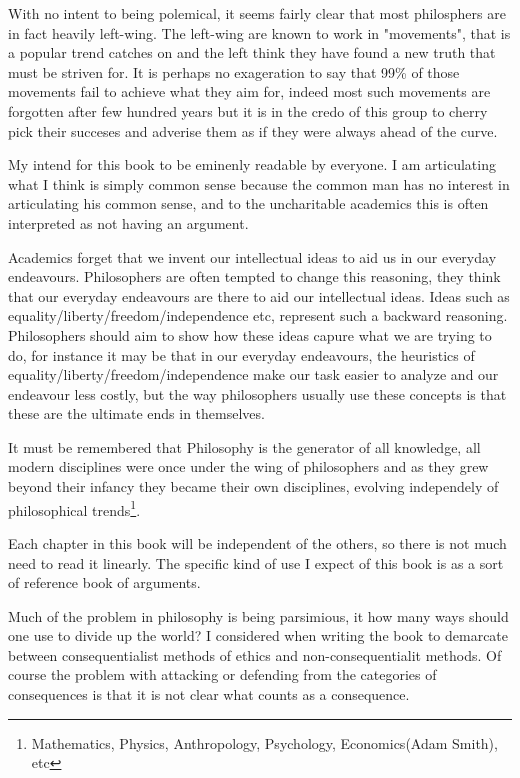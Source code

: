 With no intent to being polemical, it seems fairly clear that most philosphers are in fact heavily left-wing. The left-wing are known to work in "movements", that is a popular trend catches on and the left think they have found a new truth that must be striven for. It is perhaps no exageration to say that 99\% of those movements fail to achieve what they aim for, indeed most such movements are forgotten after few hundred years but it is in the credo of this group to cherry pick their succeses and adverise them as if they were always ahead of the curve. 

My intend for this book to be eminenly readable by everyone. I am articulating what I think is simply common sense because the common man has no interest in articulating his common sense, and to the uncharitable academics this is often interpreted as not having an argument. 

Academics forget that we invent our intellectual ideas to aid us in our everyday endeavours. Philosophers are often tempted to change this reasoning, they think that our everyday endeavours are there to aid our intellectual ideas. Ideas such as equality/liberty/freedom/independence etc, represent such a backward reasoning. Philosophers should aim to show how these ideas capure what we are trying to do, for instance it may be that in our everyday endeavours, the heuristics of equality/liberty/freedom/independence make our task easier to analyze and our endeavour less costly, but the way philosophers usually use these concepts is that these are the ultimate ends in themselves. 


It must be remembered that Philosophy is the generator of all knowledge, all modern disciplines were once under the wing of philosophers and as they grew beyond their infancy they became their own disciplines, evolving independely of philosophical trends\footnote{Mathematics, Physics, Anthropology, Psychology, Economics(Adam Smith), etc}. 


Each chapter in this book will be independent of the others, so there is not much need to read it linearly. The specific kind of use I expect of this book is as a sort of reference book of arguments. 

Much of the problem in philosophy is being parsimious, it how many ways should one use to divide up the world? I considered when writing the book to demarcate between consequentialist methods of ethics and non-consequentialit methods. Of course the problem with attacking or defending from the categories of consequences is that it is not clear what counts as a consequence. 

